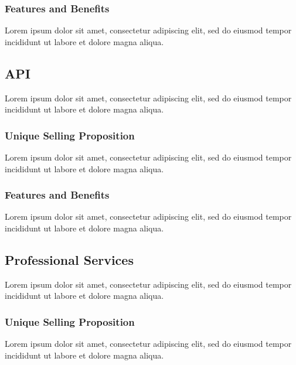 \subsubsection*{Features and Benefits}

Lorem ipsum dolor sit amet, consectetur adipiscing elit, sed do eiusmod tempor incididunt ut labore et dolore magna aliqua.


\subsection{API}

Lorem ipsum dolor sit amet, consectetur adipiscing elit, sed do eiusmod tempor incididunt ut labore et dolore magna aliqua.

\subsubsection*{Unique Selling Proposition}

Lorem ipsum dolor sit amet, consectetur adipiscing elit, sed do eiusmod tempor incididunt ut labore et dolore magna aliqua.

\subsubsection*{Features and Benefits}

Lorem ipsum dolor sit amet, consectetur adipiscing elit, sed do eiusmod tempor incididunt ut labore et dolore magna aliqua.


\subsection{Professional Services}

Lorem ipsum dolor sit amet, consectetur adipiscing elit, sed do eiusmod tempor incididunt ut labore et dolore magna aliqua.

\subsubsection*{Unique Selling Proposition}

Lorem ipsum dolor sit amet, consectetur adipiscing elit, sed do eiusmod tempor incididunt ut labore et dolore magna aliqua.

